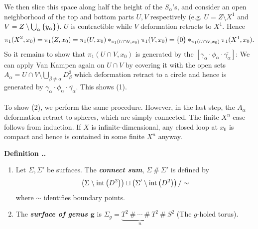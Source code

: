 \documentclass{natsirt}
\newcommand{\ol}{\overline}
\renewcommand{\emph}[1]{\textbf{\textit{#1}}}
\newcounter{def}[section]
\newenvironment{defbox}[1][]{
\begin{bluebox}[#1]\refstepcounter{def}\textbf{Definition \thesection.\thedef. }}{\end{bluebox}}
\begin{document}
We then slice this space along half the height of the $S_\alpha$'s, and consider an open neighborhood of the top and bottom parts $U,V$ respectively (e.g. $U=Z\setminus X^1$ and $V=Z\setminus \bigcup_\alpha\left\{ y_\alpha \right\}$). $U$ is contractible while $V$ deformation retracts to $X^1$. Hence
\begin{align*}
    \pi_1(X^2,x_0) = \pi_1(Z,x_0) = \pi_1(U,x_0) *_{\pi_1(U\cap V, x_0)} \pi_1(V,x_0) = \left\{ 0 \right\} *_{\pi_1(U\cap V, x_0)} \pi_1(X^1,x_0).
\end{align*}
So it remains to show that $\pi_1(U\cap V, x_0)$ is generated by the $[\gamma_\alpha \cdot \phi_\alpha \cdot \ol{\gamma_\alpha}]$: We can apply Van Kampen again on $U\cap V$ by covering it with the open sets $A_\alpha = U\cap V \setminus \bigcup_{\beta\neq \alpha} D^2_\beta$ which deformation retract to a circle and hence is generated by $\gamma_\alpha \cdot \phi_\alpha \cdot \ol{\gamma_\alpha}$. This shows (1).
\\ \\
\quad To show (2), we perform the same procedure. However, in the last step, the $A_\alpha$ deformation retract to spheres, which are simply connected. The finite $X^n$ case follows from induction. If $X$ is infinite-dimensional, any closed loop at $x_0$ is compact and hence is contained in some finite $X^n$ anyway.\QED

\begin{defbox}
\begin{enumerate}
    \item Let $\Sigma, \Sigma'$ be surfaces. The \emph{connect sum}, $\Sigma \ \# \ \Sigma'$ is defined by
    \begin{align*}
        \left( \Sigma \setminus \text{int}\left( D^2 \right) \right) \sqcup \left( \Sigma' \setminus \text{int}\left( D^2 \right) \right) / \sim
    \end{align*}
    where $\sim$ identifies boundary points.
    \item The \emph{surface of genus $\pmb{g}$} is $\Sigma_g=\underbrace{T^2 \ \# \ \cdots \ \# \ T^2}_n \ \# \ S^2$ (The $g$-holed torus).
\end{enumerate}
    
\end{defbox}
\end{document}
